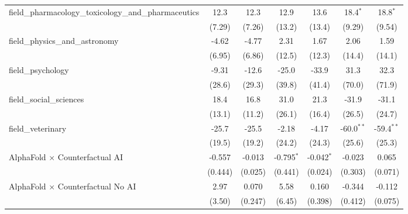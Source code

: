 \begin{tabular}{lcccccc}
   field\_pharmacology\_toxicology\_and\_pharmaceutics         & 12.3          & 12.3          & 12.9           & 13.6          & 18.4$^{*}$    & 18.8$^{*}$\\   
                                                               & (7.29)        & (7.26)        & (13.2)         & (13.4)        & (9.29)        & (9.54)\\   
   field\_physics\_and\_astronomy                              & -4.62         & -4.77         & 2.31           & 1.67          & 2.06          & 1.59\\   
                                                               & (6.95)        & (6.86)        & (12.5)         & (12.3)        & (14.4)        & (14.1)\\   
   field\_psychology                                           & -9.31         & -12.6         & -25.0          & -33.9         & 31.3          & 32.3\\   
                                                               & (28.6)        & (29.3)        & (39.8)         & (41.4)        & (70.0)        & (71.9)\\   
   field\_social\_sciences                                     & 18.4          & 16.8          & 31.0           & 21.3          & -31.9         & -31.1\\   
                                                               & (13.1)        & (11.2)        & (26.1)         & (16.4)        & (26.5)        & (24.7)\\   
   field\_veterinary                                           & -25.7         & -25.5         & -2.18          & -4.17         & -60.0$^{**}$  & -59.4$^{**}$\\   
                                                               & (19.5)        & (19.2)        & (24.2)         & (24.3)        & (25.6)        & (25.3)\\   
   AlphaFold $\times$ Counterfactual AI                        & -0.557        & -0.013        & -0.795$^{*}$   & -0.042$^{*}$  & -0.023        & 0.065\\   
                                                               & (0.444)       & (0.025)       & (0.441)        & (0.024)       & (0.303)       & (0.071)\\   
   AlphaFold $\times$ Counterfactual No AI                     & 2.97          & 0.070         & 5.58           & 0.160         & -0.344        & -0.112\\   
                                                               & (3.50)        & (0.247)       & (6.45)         & (0.398)       & (0.412)       & (0.075)\\   

\end{tabular}

